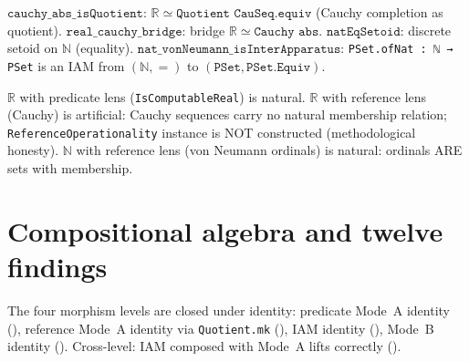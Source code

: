 \begin{definition}
\label{def:numbers_hybrid}
\leanok
{}
$\texttt{cauchy\_abs\_isQuotient}$: $\mathbb{R} \simeq \texttt{Quotient
CauSeq.equiv}$ (Cauchy completion as quotient).
$\texttt{real\_cauchy\_bridge}$: bridge $\mathbb{R} \simeq \texttt{Cauchy abs}$.
$\texttt{natEqSetoid}$: discrete setoid on $\mathbb{N}$ (equality).
$\texttt{nat\_vonNeumann\_isInterApparatus}$:
\texttt{PSet.ofNat : ℕ → PSet} is an IAM from $(\mathbb{N}, =)$ to
$(\texttt{PSet}, \texttt{PSet.Equiv})$.

$\mathbb{R}$ with predicate lens (\texttt{IsComputableReal}) is natural.
$\mathbb{R}$ with reference lens (Cauchy) is artificial: Cauchy sequences
carry no natural membership relation; \texttt{ReferenceOperationality}
instance is NOT constructed (methodological honesty).
$\mathbb{N}$ with reference lens (von Neumann ordinals) is natural:
ordinals ARE sets with membership.
\end{definition}

\section{Compositional algebra and twelve findings}
\label{sec:apparatus_findings}

\begin{definition}
\label{def:composition}
\leanok
{}
The four morphism levels are closed under identity:
predicate Mode~A identity (\axiomprofile{[]}),
reference Mode~A identity via \texttt{Quotient.mk}
(),
IAM identity (\axiomprofile{[]}),
Mode~B identity (\axiomprofile{[]}).
Cross-level: IAM composed with Mode~A lifts correctly
().
\end{definition}

